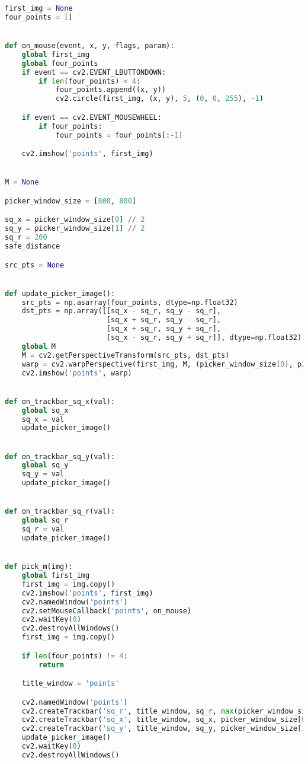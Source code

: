 \begin{lstlisting}[language=Python]
first_img = None
four_points = []


def on_mouse(event, x, y, flags, param):
    global first_img
    global four_points
    if event == cv2.EVENT_LBUTTONDOWN:
        if len(four_points) < 4:
            four_points.append((x, y))
            cv2.circle(first_img, (x, y), 5, (0, 0, 255), -1)

    if event == cv2.EVENT_MOUSEWHEEL:
        if four_points:
            four_points = four_points[:-1]

    cv2.imshow('points', first_img)


M = None

picker_window_size = [800, 800]

sq_x = picker_window_size[0] // 2
sq_y = picker_window_size[1] // 2
sq_r = 200
safe_distance

src_pts = None


def update_picker_image():
    src_pts = np.asarray(four_points, dtype=np.float32)
    dst_pts = np.array([[sq_x - sq_r, sq_y - sq_r],
                        [sq_x + sq_r, sq_y - sq_r],
                        [sq_x + sq_r, sq_y + sq_r],
                        [sq_x - sq_r, sq_y + sq_r]], dtype=np.float32)
    global M
    M = cv2.getPerspectiveTransform(src_pts, dst_pts)
    warp = cv2.warpPerspective(first_img, M, (picker_window_size[0], picker_window_size[1]))
    cv2.imshow('points', warp)


def on_trackbar_sq_x(val):
    global sq_x
    sq_x = val
    update_picker_image()


def on_trackbar_sq_y(val):
    global sq_y
    sq_y = val
    update_picker_image()


def on_trackbar_sq_r(val):
    global sq_r
    sq_r = val
    update_picker_image()


def pick_m(img):
    global first_img
    first_img = img.copy()
    cv2.imshow('points', first_img)
    cv2.namedWindow('points')
    cv2.setMouseCallback('points', on_mouse)
    cv2.waitKey(0)
    cv2.destroyAllWindows()
    first_img = img.copy()

    if len(four_points) != 4:
        return

    title_window = 'points'

    cv2.namedWindow('points')
    cv2.createTrackbar('sq_r', title_window, sq_r, max(picker_window_size), on_trackbar_sq_r)
    cv2.createTrackbar('sq_x', title_window, sq_x, picker_window_size[0], on_trackbar_sq_x)
    cv2.createTrackbar('sq_y', title_window, sq_y, picker_window_size[1], on_trackbar_sq_y)
    update_picker_image()
    cv2.waitKey(0)
    cv2.destroyAllWindows()


\end{lstlisting}
